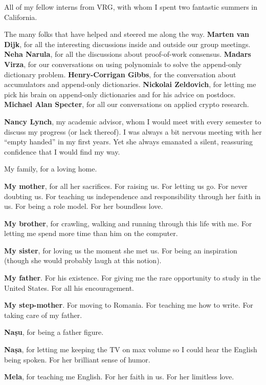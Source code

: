 All of my fellow interns from VRG, with whom I spent two fantastic summers in California.

The many folks that have helped and steered me along the way.
\textbf{Marten van Dijk}, for all the interesting discussions inside and outside our group meetings.
\textbf{Neha Narula}, for all the discussions about proof-of-work consensus.
\textbf{Madars Virza}, for our conversations on using polynomials to solve the append-only dictionary problem.
\textbf{Henry-Corrigan Gibbs}, for the conversation about accumulators and append-only dictionaries.
\textbf{Nickolai Zeldovich}, for letting me pick his brain on append-only dictionaries and for his advice on postdocs.
\textbf{Michael Alan Specter}, for all our conversations on applied crypto research.

\textbf{Nancy Lynch}, my academic advisor, whom I would meet with every semester to discuss my progress (or lack thereof).
I was always a bit nervous meeting with her ``empty handed'' in my first years.
Yet she always emanated a silent, reassuring confidence that I would find my way.

My family, for a loving home.

\textbf{My mother}, for all her sacrifices.
For raising us.
For letting us go.
For never doubting us.
For teaching us independence and responsibility through her faith in us.
For being a role model.
For her boundless love.

\textbf{My brother}, for crawling, walking and running through this life with me.
For letting me spend more time than him on the computer.

\textbf{My sister}, for loving us the moment she met us.
For being an inspiration (though she would probably laugh at this notion).

\textbf{My father}.
For his existence.
For giving me the rare opportunity to study in the United States.
For all his encouragement.

\textbf{My step-mother}.
For moving to Romania.
For teaching me how to write.
For taking care of my father.

\textbf{Nașu}, for being a father figure.

\textbf{Nașa}, for letting me keeping the TV on max volume so I could hear the English being spoken.
For her brilliant sense of humor.

\textbf{Mela}, for teaching me English.
For her faith in us.
For her limitless love.

